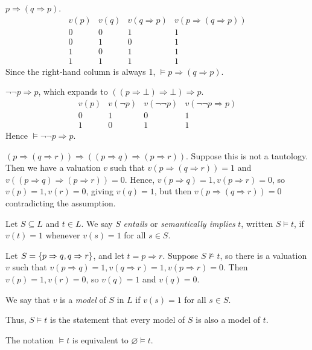\begin{example}
    \( p \Rightarrow (q \Rightarrow p) \).
    \[ \begin{array}{cccc}
        v(p) & v(q) & v(q \Rightarrow p) & v(p \Rightarrow (q \Rightarrow p)) \\
        0 & 0 & 1 & 1 \\
        0 & 1 & 0 & 1 \\
        1 & 0 & 1 & 1 \\
        1 & 1 & 1 & 1
    \end{array} \]
    Since the right-hand column is always 1, \( \models p \Rightarrow (q \Rightarrow p) \).
\end{example}
\begin{example}
    \( \neg \neg p \Rightarrow p \), which expands to \( ((p \Rightarrow \bot) \Rightarrow \bot) \Rightarrow p \).
    \[ \begin{array}{cccc}
        v(p) & v(\neg p) & v(\neg \neg p) & v(\neg \neg p \Rightarrow p) \\
        0 & 1 & 0 & 1 \\
        1 & 0 & 1 & 1
    \end{array} \]
    Hence \( \models \neg \neg p \Rightarrow p \).
\end{example}
\begin{example}
    \( (p \Rightarrow (q \Rightarrow r)) \Rightarrow ((p \Rightarrow q) \Rightarrow (p \Rightarrow r)) \).
    Suppose this is not a tautology.
    Then we have a valuation \( v \) such that \( v(p \Rightarrow (q \Rightarrow r)) = 1 \) and \( v((p \Rightarrow q) \Rightarrow (p \Rightarrow r)) = 0 \).
    Hence, \( v(p \Rightarrow q) = 1, v(p \Rightarrow r) = 0 \), so \( v(p) = 1, v(r) = 0 \), giving \( v(q) = 1 \), but then \( v(p \Rightarrow (q \Rightarrow r)) = 0 \) contradicting the assumption.
\end{example}
\begin{definition}
    Let \( S \subseteq L \) and \( t \in L \).
    We say \( S \) \emph{entails} or \emph{semantically implies} \( t \), written \( S \models t \), if \( v(t) = 1 \) whenever \( v(s) = 1 \) for all \( s \in S \).
\end{definition}
\begin{example}
    Let \( S = \qty{p \Rightarrow q, q \Rightarrow r} \), and let \( t = p \Rightarrow r \).
    Suppose \( S \not\models t \), so there is a valuation \( v \) such that \( v(p \Rightarrow q) = 1, v(q \Rightarrow r) = 1, v(p \Rightarrow r) = 0 \).
    Then \( v(p) = 1, v(r) = 0 \), so \( v(q) = 1 \) and \( v(q) = 0 \).
\end{example}
\begin{definition}
    We say that \( v \) is a \emph{model} of \( S \) in \( L \) if \( v(s) = 1 \) for all \( s \in S \).
\end{definition}
Thus, \( S \models t \) is the statement that every model of \( S \) is also a model of \( t \).
\begin{remark}
    The notation \( \models t \) is equivalent to \( \varnothing \models t \).
\end{remark}


